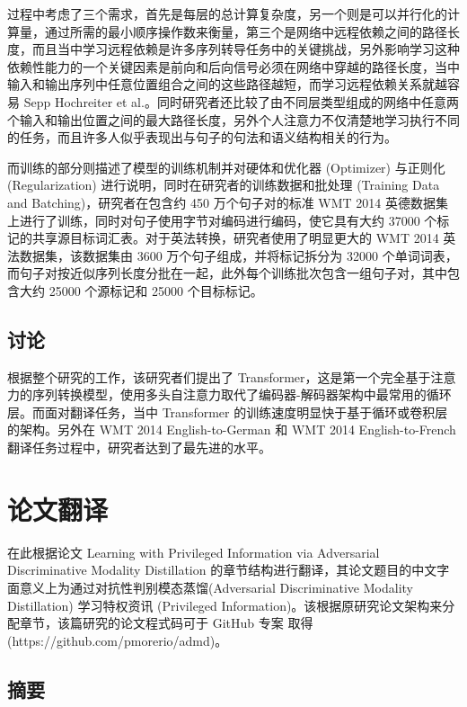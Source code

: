 过程中考虑了三个需求，首先是每层的总计算复杂度，另一个则是可以并行化的计算量，通过所需的最小顺序操作数来衡量，第三个是网络中远程依赖之间的路径长度，而且当中学习远程依赖是许多序列转导任务中的关键挑战，另外影响学习这种依赖性能力的一个关键因素是前向和后向信号必须在网络中穿越的路径长度，当中输入和输出序列中任意位置组合之间的这些路径越短，而学习远程依赖关系就越容易 Sepp Hochreiter et al.。同时研究者还比较了由不同层类型组成的网络中任意两个输入和输出位置之间的最大路径长度，另外个人注意力不仅清楚地学习执行不同的任务，而且许多人似乎表现出与句子的句法和语义结构相关的行为。

而训练的部分则描述了模型的训练机制并对硬体和优化器 (Optimizer) 与正则化 (Regularization) 进行说明，同时在研究者的训练数据和批处理 (Training Data and Batching)，研究者在包含约 450 万个句子对的标准 WMT 2014 英德数据集上进行了训练，同时对句子使用字节对编码进行编码，使它具有大约 37000 个标记的共享源目标词汇表。对于英法转换，研究者使用了明显更大的 WMT 2014 英法数据集，该数据集由 3600 万个句子组成，并将标记拆分为 32000 个单词词表，而句子对按近似序列长度分批在一起，此外每个训练批次包含一组句子对，其中包含大约 25000 个源标记和 25000 个目标标记。

\subsection{讨论}

根据整个研究的工作，该研究者们提出了 Transformer，这是第一个完全基于注意力的序列转换模型，使用多头自注意力取代了编码器-解码器架构中最常用的循环层。而面对翻译任务，当中 Transformer 的训练速度明显快于基于循环或卷积层的架构。另外在 WMT 2014 English-to-German 和 WMT 2014 English-to-French 翻译任务过程中，研究者达到了最先进的水平。

\section{论文翻译}

在此根据论文 Learning with Privileged Information via Adversarial Discriminative Modality Distillation 的章节结构进行翻译，其论文题目的中文字面意义上为通过对抗性判别模态蒸馏(Adversarial Discriminative Modality Distillation) 学习特权资讯 (Privileged Information)。该根据原研究论文架构来分配章节，该篇研究的论文程式码可于 GitHub 专案
取得 (https://github.com/pmorerio/admd)。

\subsection{摘要}

